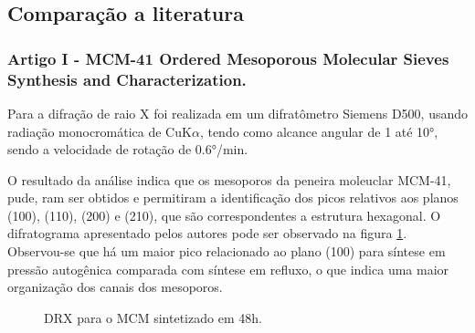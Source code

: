 \subsection{Comparação a literatura}

\subsubsection*{\textbf{Artigo I} - MCM-41 Ordered Mesoporous Molecular Sieves Synthesis
and Characterization.}

Para  a difração de raio X foi realizada em
um difratômetro Siemens D500, usando radiação monocromática de CuK$\alpha$,
tendo como alcance angular de 1 até 10°, sendo a velocidade de rotação de
0.6°/min. 

O resultado da análise indica que os mesoporos da peneira moleuclar MCM-41,
pude, ram ser obtidos e permitiram a identificação dos picos relativos aos planos
(100), (110), (200) e (210), que são correspondentes a estrutura hexagonal. O
difratograma apresentado pelos autores pode ser observado na figura \ref{figure:difratogramArticleAguiar}.
Observou-se que há um maior pico relacionado ao plano (100) para síntese
em pressão autogênica comparada com síntese em refluxo, o que indica uma maior
organização dos canais dos mesoporos.

\begin{figure}[ht]
    \center
    \begin{minipage}{14cm}
     \caption{DRX para o MCM sintetizado em 48h.}\label{figure:difratogramArticleAguiar} 
     \end{minipage}
\end{figure}

